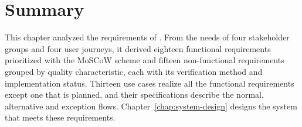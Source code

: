 \section{Summary}
\label{sec:ra-summary}
This chapter analyzed the requirements of \sysname{}. From the needs of four stakeholder groups and four user journeys, it derived eighteen functional requirements prioritized with the MoSCoW scheme and fifteen non-functional requirements grouped by quality characteristic, each with its verification method and implementation status. Thirteen use cases realize all the functional requirements except one that is planned, and their specifications describe the normal, alternative and exception flows. Chapter~\ref{chap:system-design} designs the system that meets these requirements.
